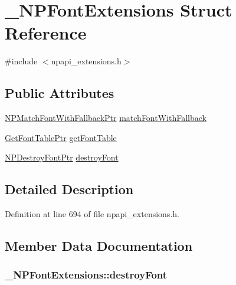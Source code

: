 \hypertarget{struct___n_p_font_extensions}{
\section{\_\-NPFontExtensions Struct Reference}
\label{struct___n_p_font_extensions}
}


{\ttfamily \#include $<$npapi\_\-extensions.h$>$}

\subsection*{Public Attributes}
\begin{DoxyCompactItemize}
\item 
\hyperlink{npapi__extensions_8h_a34e4527ad657576de1f6ade509b9bdf0}{NPMatchFontWithFallbackPtr} \hyperlink{struct___n_p_font_extensions_a76de211ff3a72e2ece70f6c54d81a816}{matchFontWithFallback}
\item 
\hyperlink{npapi__extensions_8h_aa4528a94d7c4edaf308a784b25310069}{GetFontTablePtr} \hyperlink{struct___n_p_font_extensions_a7e7d1715bdf84093be3e08f98a986b2b}{getFontTable}
\item 
\hyperlink{npapi__extensions_8h_a18516feaf8eb67200682c7b55f0844a5}{NPDestroyFontPtr} \hyperlink{struct___n_p_font_extensions_a1e3bbc4b7ee955799f9805e8a0ccc3dc}{destroyFont}
\end{DoxyCompactItemize}


\subsection{Detailed Description}


Definition at line 694 of file npapi\_\-extensions.h.



\subsection{Member Data Documentation}
\hypertarget{struct___n_p_font_extensions_a1e3bbc4b7ee955799f9805e8a0ccc3dc}{
\subsubsection[{destroyFont}]{ {\bf \_\-NPFontExtensions::destroyFont}}}
\label{struct___n_p_font_extensions_a1e3bbc4b7ee955799f9805e8a0ccc3dc}


